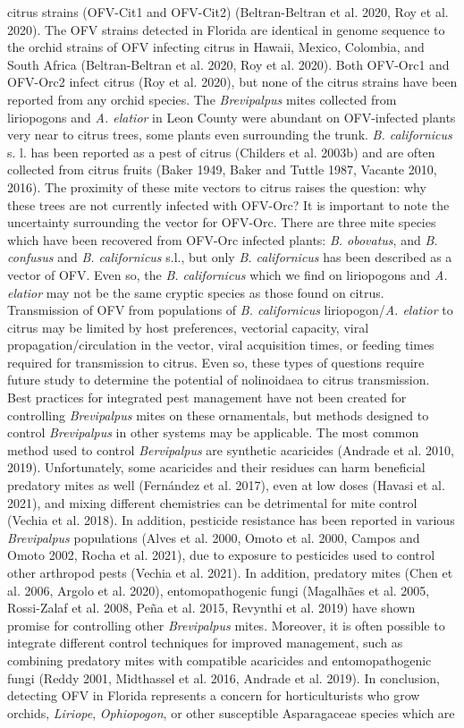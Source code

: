 \documentclass[12pt,final,CPage]{ufthesis}
\begin{document}
{citrus strains (OFV-Cit1 and OFV-Cit2) (Beltran-Beltran et al. 2020, Roy et al. 2020). The OFV strains detected in Florida are identical in genome sequence to the orchid strains of OFV infecting citrus in Hawaii, Mexico, Colombia, and South Africa (Beltran-Beltran et al. 2020, Roy et al. 2020). Both OFV-Orc1 and OFV-Orc2 infect citrus (Roy et al. 2020), but none of the citrus strains have been reported from any orchid species. The \emph{Brevipalpus} mites collected from liriopogons and \emph{A. elatior} in Leon County were abundant on OFV-infected plants very near to citrus trees, some plants even surrounding the trunk. \emph{B. californicus} s. l. has been reported as a pest of citrus (Childers et al. 2003b) and are often collected from citrus fruits (Baker 1949, Baker and Tuttle 1987, Vacante 2010, 2016). The proximity of these mite vectors to citrus raises the question: why these trees are not currently infected with OFV-Orc? It is important to note the uncertainty surrounding the vector for OFV-Orc. There are three mite species which have been recovered from OFV-Orc infected plants: \emph{B. obovatus}, and \emph{B. confusus} and \emph{B. californicus} s.l., but only \emph{B. californicus} has been described as a vector of OFV. Even so, the \emph{B. californicus} which we find on liriopogons and \emph{A. elatior} may not be the same cryptic species as those found on citrus. Transmission of OFV from populations of \emph{B. californicus} liriopogon/\emph{A. elatior} to citrus may be limited by host preferences, vectorial capacity, viral propagation/circulation in the vector, viral acquisition times, or feeding times required for transmission to citrus. Even so, these types of questions require future study to determine the potential of nolinoidaea to citrus transmission. Best practices for integrated pest management have not been created for controlling \emph{Brevipalpus} mites on these ornamentals, but methods designed to control \emph{Brevipalpus} in other systems may be applicable. The most common method used to control \emph{Bervipalpus} are synthetic acaricides (Andrade et al. 2010, 2019). Unfortunately, some acaricides and their residues can harm beneficial predatory mites as well (Fernández et al. 2017), even at low doses (Havasi et al. 2021), and mixing different chemistries can be detrimental for mite control (Vechia et al. 2018). In addition, pesticide resistance has been reported in various \emph{Brevipalpus} populations (Alves et al. 2000, Omoto et al. 2000, Campos and Omoto 2002, Rocha et al. 2021), due to exposure to pesticides used to control other arthropod pests (Vechia et al. 2021). In addition, predatory mites (Chen et al. 2006, Argolo et al. 2020), entomopathogenic fungi (Magalhães et al. 2005, Rossi-Zalaf et al. 2008, Peña et al. 2015, Revynthi et al. 2019) have shown promise for controlling other \emph{Brevipalpus} mites. Moreover, it is often possible to integrate different control techniques for improved management, such as combining predatory mites with compatible acaricides and entomopathogenic fungi (Reddy 2001, Midthassel et al. 2016, Andrade et al. 2019). In conclusion, detecting OFV in Florida represents a concern for horticulturists who grow orchids, \emph{Liriope}, \emph{Ophiopogon}, or other susceptible Asparagaceae species which are }
\end{document}
